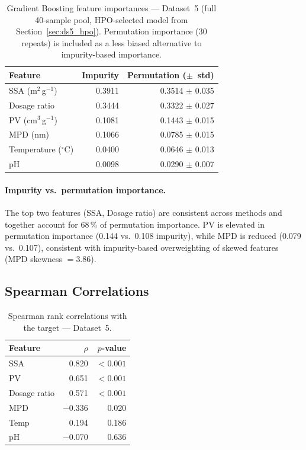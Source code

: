 \documentclass[12pt,a4paper]{article}
\begin{document}
\begin{table}[h]
\centering
\caption{Gradient Boosting feature importances — Dataset~5
  (full 40-sample pool, HPO-selected model from Section~\ref{sec:ds5_hpo}).
  Permutation importance (30 repeats) is included as a less biased
  alternative to impurity-based importance.}
\label{tab:ds5_importance}
\begin{tabular}{lrr}
\toprule
Feature & Impurity & Permutation ($\pm$~std) \\
\midrule
SSA (m$^2$\,g$^{-1}$)            & 0.3911 & 0.3514 $\pm$ 0.035 \\
Dosage ratio                      & 0.3444 & 0.3322 $\pm$ 0.027 \\
PV (cm$^3$\,g$^{-1}$)            & 0.1081 & 0.1443 $\pm$ 0.015 \\
MPD (nm)                          & 0.1066 & 0.0785 $\pm$ 0.015 \\
Temperature ($^\circ$C)           & 0.0400 & 0.0646 $\pm$ 0.013 \\
pH                                & 0.0098 & 0.0290 $\pm$ 0.007 \\
\bottomrule
\end{tabular}
\end{table}

\paragraph{Impurity vs.\ permutation importance.}
The top two features (SSA, Dosage ratio) are consistent across methods
and together account for 68\,\% of permutation importance.  PV is
elevated in permutation importance (0.144 vs.\ 0.108 impurity), while
MPD is reduced (0.079 vs.\ 0.107), consistent with impurity-based
overweighting of skewed features (MPD skewness $= 3.86$).

\subsection{Spearman Correlations}

\begin{table}[h]
\centering
\caption{Spearman rank correlations with the target — Dataset~5.}
\label{tab:ds5_spearman}
\begin{tabular}{lrr}
\toprule
Feature & $\rho$ & $p$-value \\
\midrule
SSA            &  0.820 & $<0.001$ \\
PV             &  0.651 & $<0.001$ \\
Dosage ratio   &  0.571 & $<0.001$ \\
MPD            & $-0.336$ & 0.020 \\
Temp           &  0.194 & 0.186 \\
pH             & $-0.070$ & 0.636 \\
\bottomrule
\end{tabular}
\end{table}
\end{document}
